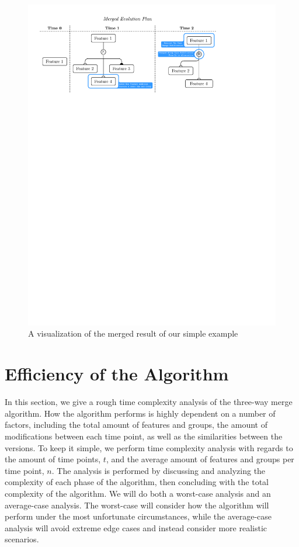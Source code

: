 \documentclass[a4paper,english]{ifimaster}
\begin{document}
\begin{figure}[htpb]
  \centering
  \includegraphics[width=\linewidth]{simple_merged_ep.pdf}
  \caption{A visualization of the merged result of our simple example}%
  \label{fig:simple_three_way_merged_result}
\end{figure}

\section{Efficiency of the Algorithm}%
\label{sec:efficiency_of_the_algorithm}

In this section, we give a rough time complexity analysis of the three-way merge algorithm. How the algorithm performs is highly dependent on a number of factors, including the total amount of features and groups, the amount of modifications between each time point, as well as the similarities between the versions. To keep it simple, we perform time complexity analysis with regards to the amount of time points, $t$, and the average amount of features and groups per time point, $n$. The analysis is performed by discussing and analyzing the complexity of each phase of the algorithm, then concluding with the total complexity of the algorithm. We will do both a worst-case analysis and an average-case analysis. The worst-case will consider how the algorithm will perform under the most unfortunate circumstances, while the average-case analysis will avoid extreme edge cases and instead consider more realistic scenarios.
\end{document}
